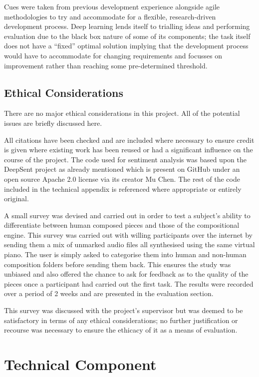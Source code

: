 \documentclass[12pt,]{article}
\begin{document}
Cues were taken from previous development experience alongside agile
methodologies to try and accommodate for a flexible, research-driven
development process. Deep learning lends itself to trialling ideas and
performing evaluation due to the black box nature of some of its
components; the task itself does not have a ``fixed'' optimal solution
implying that the development process would have to accommodate for
changing requirements and focusses on improvement rather than reaching
some pre-determined threshold.

\hypertarget{ethical-considerations}{%
\subsection{Ethical Considerations}\label{ethical-considerations}}

There are no major ethical considerations in this project. All of the
potential issues are briefly discussed here.

All citations have been checked and are included where necessary to
ensure credit is given where existing work has been reused or had a
significant influence on the course of the project. The code used for
sentiment analysis was based upon the DeepSent project as already
mentioned which is present on GitHub under an open source Apache 2.0
license via its creator Mu Chen. The rest of the code included in the
technical appendix is referenced where appropriate or entirely original.

A small survey was devised and carried out in order to test a subject's
ability to differentiate between human composed pieces and those of the
compositional engine. This survey was carried out with willing
participants over the internet by sending them a mix of unmarked audio
files all synthesised using the same virtual piano. The user is simply
asked to categorise them into human and non-human composition folders
before sending them back. This ensures the study was unbiased and also
offered the chance to ask for feedback as to the quality of the pieces
once a participant had carried out the first task. The results were
recorded over a period of 2 weeks and are presented in the evaluation
section.

This survey was discussed with the project's supervisor but was deemed
to be satisfactory in terms of any ethical considerations; no further
justification or recourse was necessary to ensure the ethicacy of it as
a means of evaluation.

\hypertarget{technical-component}{%
\section{Technical Component}\label{technical-component}}
\end{document}
